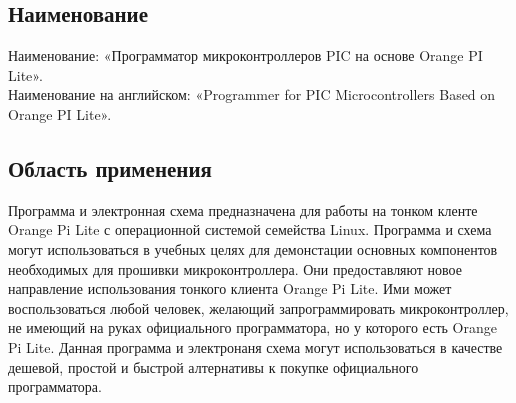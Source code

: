 \subsection{Наименование}
Наименование: «Программатор микроконтроллеров PIC на основе Orange PI Lite». \\
Наименование на английском: «Programmer for PIC Microcontrollers Based on Orange PI Lite». \\

\subsection{Область применения}
Программа и электронная схема предназначена для работы на тонком кленте Orange Pi Lite с операционной системой семейства Linux. Программа и схема могут использоваться в учебных целях для демонстации основных компонентов необходимых для прошивки микроконтроллера. Они предоставляют новое направление использования тонкого клиента Orange Pi Lite. Ими может воспользоваться любой человек, желающий запрограммировать микроконтроллер, не имеющий на руках официального программатора, но у которого есть Orange Pi Lite. Данная программа и электронаня схема могут использоваться в качестве дешевой, простой и быстрой алтернативы к покупке официального программатора.
